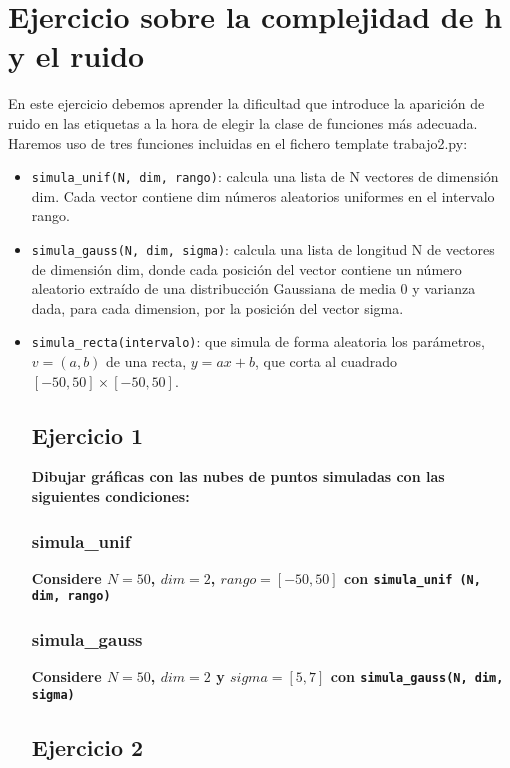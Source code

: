 \chapter{Ejercicio sobre la complejidad de h y el ruido}

En este ejercicio debemos aprender la dificultad que introduce la aparición de
ruido en las etiquetas a la hora de elegir la clase de funciones más adecuada.
Haremos uso de tres funciones incluidas en
el fichero template trabajo2.py:

\begin{itemize}

\item \texttt{simula_unif(N, dim, rango)}: calcula una lista de N vectores de dimensión
dim. Cada vector contiene dim números aleatorios uniformes en el intervalo
rango. 

\item \texttt{simula_gauss(N, dim, sigma)}: calcula una lista de
longitud N de vectores de dimensión dim, donde cada posición del vector contiene
un número aleatorio extraído de una distribucción Gaussiana de media $0$ y
varianza dada, para cada dimension, por la posición del vector sigma.  

\item \texttt{simula_recta(intervalo)}: que simula de forma
aleatoria los parámetros, $v = (a, b)$ de una recta, $y = ax + b$, que corta al
cuadrado $[−50, 50] \times [−50, 50]$.

\section{Ejercicio 1}
\textbf{Dibujar gráficas con las nubes de puntos simuladas con las siguientes
condiciones:}

\subsection{simula_unif}
\textbf{Considere $N = 50$, $dim = 2$, $rango = [−50, 50]$ con 
\texttt{simula_unif (N, dim, rango)}}


\subsection{simula_gauss}
\textbf{Considere $N = 50$, $dim = 2$ y $sigma = [5, 7]$ con 
\texttt{simula_gauss(N, dim, sigma)}}


\section{Ejercicio 2}


\end{itemize}
